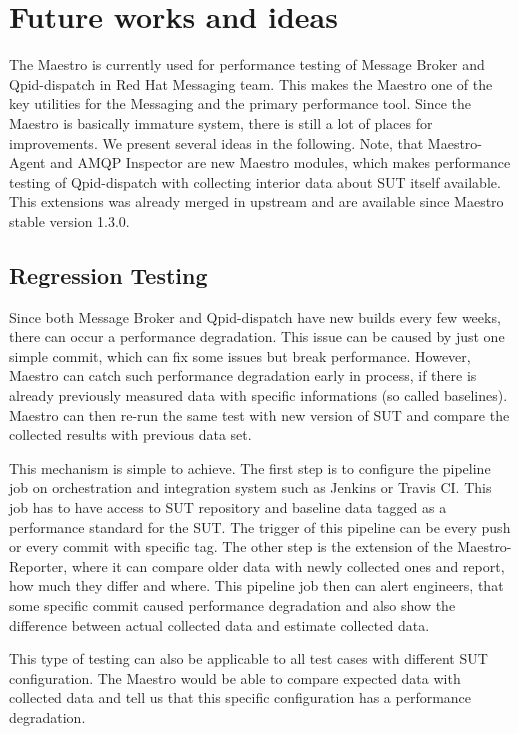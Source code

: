 
\chapter{Future works and ideas}
\label{Future works and ideas}
The Maestro is currently used for performance testing of Message Broker and Qpid-dispatch in Red Hat Messaging team. This makes the Maestro one of the key utilities for the Messaging and the primary performance tool. Since the Maestro is basically immature system, there is still a lot of places for improvements. We present several ideas in the following. Note, that Maestro-Agent and AMQP Inspector are new Maestro modules, which makes performance testing of Qpid-dispatch with collecting interior data about SUT itself available. This extensions was already merged in upstream and are available since Maestro stable version 1.3.0.

\section{Regression Testing}
Since both Message Broker and Qpid-dispatch have new builds every few weeks, there can occur a performance degradation. This issue can be caused by just one simple commit, which can fix some issues but break performance. However, Maestro can catch such performance degradation early in process, if there is already previously measured data with specific informations (so called baselines). Maestro can then re-run the same test with new version of SUT and compare the collected results with previous data set.

This mechanism is simple to achieve. The first step is to configure the pipeline job on orchestration and integration system such as Jenkins or Travis CI. This job has to have access to SUT repository and baseline data tagged as a performance standard for the SUT. The trigger of this pipeline can be every push or every commit with specific tag. The other step is the extension of the Maestro-Reporter, where it can compare older data with newly collected ones and report, how much they differ and where. This pipeline job then can alert engineers, that some specific commit caused performance degradation and also show the difference between actual collected data and estimate collected data.

This type of testing can also be applicable to all test cases with different SUT configuration. The Maestro would be able to compare expected data with collected data and tell us that this specific configuration has a performance degradation.

